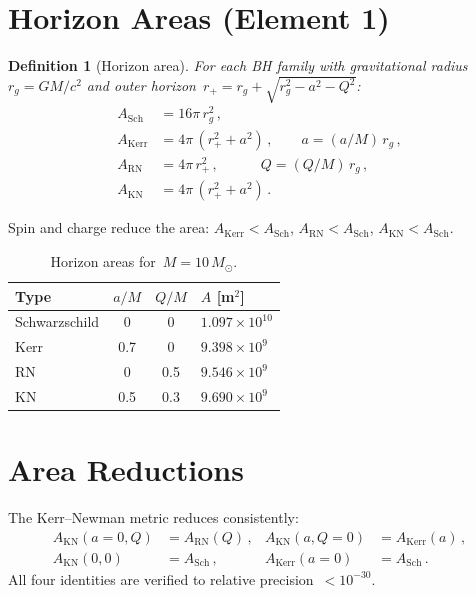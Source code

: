 \documentclass[11pt,a4paper]{article}
\newtheorem{definition}{Definition}[section]
\newcommand{\Msun}{M_\odot}
\begin{document}
\section{Horizon Areas (Element 1)}\label{sec:areas}

\begin{definition}[Horizon area]
For each BH family with gravitational radius~$r_g = GM/c^2$ and
outer horizon~$r_+ = r_g + \sqrt{r_g^2 - a^2 - Q^2}$:
\begin{align}
  A_{\mathrm{Sch}} &= 16\pi\, r_g^2\,,  \\
  A_{\mathrm{Kerr}} &= 4\pi\,(r_+^2 + a^2)\,,  \qquad a = (a/M)\,r_g\,,\\
  A_{\mathrm{RN}} &= 4\pi\, r_+^2\,,    \qquad\quad Q = (Q/M)\,r_g\,,\\
  A_{\mathrm{KN}} &= 4\pi\,(r_+^2 + a^2)\,.
\end{align}
\end{definition}

Spin and charge reduce the area:
$A_{\mathrm{Kerr}} < A_{\mathrm{Sch}}$,
$A_{\mathrm{RN}} < A_{\mathrm{Sch}}$,
$A_{\mathrm{KN}} < A_{\mathrm{Sch}}$.

\begin{table}[h]
\centering
\caption{Horizon areas for~$M = 10\,\Msun$.}
\label{tab:areas}
\begin{tabular}{lccl}
\toprule
Type & $a/M$ & $Q/M$ & $A$ [m$^2$] \\
\midrule
Schwarzschild & 0 & 0 & $1.097\times 10^{10}$ \\
Kerr & 0.7 & 0 & $9.398\times 10^{9}$ \\
RN & 0 & 0.5 & $9.546\times 10^{9}$ \\
KN & 0.5 & 0.3 & $9.690\times 10^{9}$ \\
\bottomrule
\end{tabular}
\end{table}

\section{Area Reductions}\label{sec:reductions}

The Kerr--Newman metric reduces consistently:
\begin{align}
  A_{\mathrm{KN}}(a{=}0,Q) &= A_{\mathrm{RN}}(Q)\,, &
  A_{\mathrm{KN}}(a,Q{=}0) &= A_{\mathrm{Kerr}}(a)\,, \\
  A_{\mathrm{KN}}(0,0) &= A_{\mathrm{Sch}}\,, &
  A_{\mathrm{Kerr}}(a{=}0) &= A_{\mathrm{Sch}}\,.
\end{align}
All four identities are verified to relative precision~$< 10^{-30}$.
\end{document}
